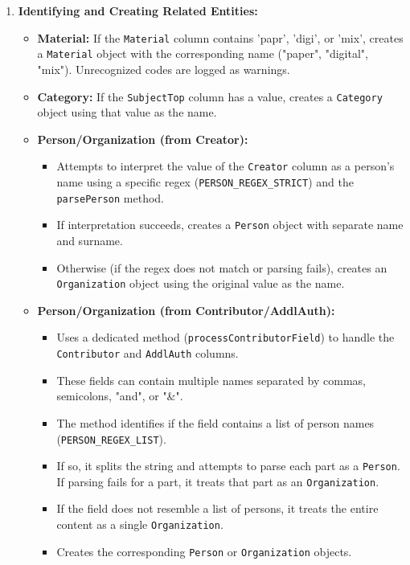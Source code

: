 \documentclass[11pt, a4paper]{article}
\begin{document}
\begin{enumerate}
    \item \textbf{Identifying and Creating Related Entities:}
        \begin{itemize}
            \item \textbf{Material:} If the \texttt{Material} column contains 'papr', 'digi', or 'mix', creates a \texttt{Material} object with the corresponding name ("paper", "digital", "mix"). Unrecognized codes are logged as warnings.
            \item \textbf{Category:} If the \texttt{SubjectTop} column has a value, creates a \texttt{Category} object using that value as the name.
            \item \textbf{Person/Organization (from Creator):}
                \begin{itemize}
                    \item Attempts to interpret the value of the \texttt{Creator} column as a person's name using a specific regex (\texttt{PERSON\_REGEX\_STRICT}) and the \texttt{parsePerson} method.
                    \item If interpretation succeeds, creates a \texttt{Person} object with separate name and surname.
                    \item Otherwise (if the regex does not match or parsing fails), creates an \texttt{Organization} object using the original value as the name.
                \end{itemize}
            \item \textbf{Person/Organization (from Contributor/AddlAuth):}
                \begin{itemize}
                    \item Uses a dedicated method (\texttt{processContributorField}) to handle the \texttt{Contributor} and \texttt{AddlAuth} columns.
                    \item These fields can contain multiple names separated by commas, semicolons, "and", or "&".
                    \item The method identifies if the field contains a list of person names (\texttt{PERSON\_REGEX\_LIST}).
                    \item If so, it splits the string and attempts to parse each part as a \texttt{Person}. If parsing fails for a part, it treats that part as an \texttt{Organization}.
                    \item If the field does not resemble a list of persons, it treats the entire content as a single \texttt{Organization}.
                    \item Creates the corresponding \texttt{Person} or \texttt{Organization} objects.
                \end{itemize}
        \end{itemize}


\end{enumerate}
\end{document}
